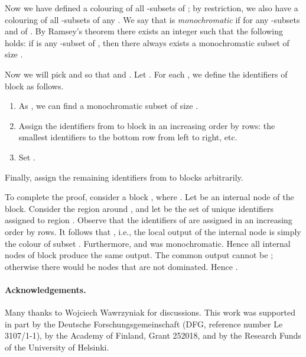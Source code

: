 \documentclass[11pt,a4paper]{article}
\theoremstyle{definition}
\begin{document}
Now we have defined a colouring of all -subsets of ; by restriction, we also have a colouring of all -subsets of any . We say that  is \emph{monochromatic} if  for any -subsets  and  of . By Ramsey's theorem \cite{ramsey30problem} there exists an integer  such that the following holds: if  is any -subset of , then there always exists a monochromatic subset  of size .

Now we will pick  and  so that  and . Let . For each , we define the identifiers of block  as follows.
\begin{enumerate}[noitemsep]
    \item As , we can find a monochromatic subset  of size .
    \item Assign the identifiers from  to block  in an increasing order by rows: the smallest  identifiers to the bottom row from left to right, etc.
    \item Set .
\end{enumerate}
Finally, assign the remaining  identifiers from  to blocks  arbitrarily.

To complete the proof, consider a block , where . Let  be an internal node of the block. Consider the  region  around , and let  be the set of unique identifiers assigned to region . Observe that the identifiers of  are assigned in an increasing order by rows. It follows that , i.e., the local output of the internal node  is simply the colour of subset . Furthermore,  and  was monochromatic. Hence all internal nodes of block  produce the same output. The common output cannot be ; otherwise there would be nodes that are not dominated. Hence .


\paragraph{Acknowledgements.}

Many thanks to Wojciech Wawrzyniak for discussions. This work was supported in part by the Deutsche Forschungsgemeinschaft (DFG, reference number Le 3107/1-1), by the Academy of Finland, Grant 252018, and by the Research Funds of the University of Helsinki.


\def\UrlFont{\sf\footnotesize}
\setlength{\bibsep}{3pt}


\end{document}
